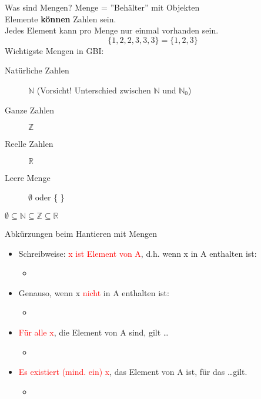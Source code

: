 \begin{frame}{Was sind Mengen?}
 Menge = ''Behälter'' mit Objekten\\
 Elemente \textbf{können} Zahlen sein.\\
 Jedes Element kann pro Menge nur einmal vorhanden sein.\\
 \begin{equation*}
  \lbrace 1, 2, 2, 3, 3, 3\rbrace = \lbrace 1, 2, 3\rbrace
 \end{equation*}
 Wichtigste Mengen in GBI:\\
 \begin{description}
  \item[Natürliche Zahlen] $\mathbb{N}$ (Vorsicht! Unterschied zwischen $\mathbb{N}$ und $\mathbb{N}_0$)
  \item[Ganze Zahlen] $\mathbb{Z}$
  \item[Reelle Zahlen] $\mathbb{R}$
  \item[Leere Menge] $\emptyset$ oder \{   \}
 \end{description}
 $\emptyset\subseteq\mathbb{N}\subseteq\mathbb{Z}\subseteq\mathbb{R}$
\end{frame}

\begin{frame}{Abkürzungen beim Hantieren mit Mengen}
 \begin{itemize}
  \item[] Schreibweise: \textcolor{red}{x ist Element von A}, d.h. wenn x in A enthalten ist:
        \begin{itemize}
         \item[] 
        \end{itemize}
  \item[] Genauso, wenn x \textcolor{red}{nicht} in A enthalten ist:
        \begin{itemize}
         \item[] 
        \end{itemize}
  \item[] \textcolor{red}{Für alle x}, die Element von A sind, gilt \dots
        \begin{itemize}
         \item[] 
        \end{itemize}
  \item[] \textcolor{red}{Es existiert (mind. ein) x}, das Element von A ist, für das \dots gilt.
        \begin{itemize}
         \item[] 
        \end{itemize}
 \end{itemize}
\end{frame}


